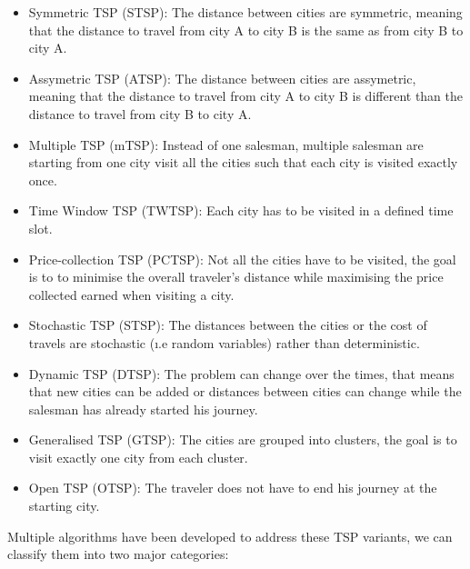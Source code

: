 \begin{itemize}
    \item Symmetric TSP (STSP): The distance between cities are symmetric, meaning that the distance to travel from city A to city B is the same as from city B to city A. %
    \item Assymetric TSP (ATSP): The distance between cities are assymetric, meaning that the distance to travel from city A to city B is different than the distance to travel from city B to city A.\cite{ASTP}
    \item Multiple TSP (mTSP): Instead of one salesman, multiple salesman are starting from one city visit all the cities such that each city is visited exactly once. \cite{mTSP}
    \item Time Window TSP (TWTSP): Each city has to be visited in a defined time slot. \cite{TWTSP}
    \item Price-collection TSP (PCTSP): Not all the cities have to be visited, the goal is to to minimise the overall traveler's distance while maximising the price collected earned when visiting a city. \cite{PCTSP}
    \item Stochastic TSP (STSP): The distances between the cities or the cost of travels are stochastic (\i.e random variables) rather than deterministic. \cite{Stochastic_TSP}
    \item Dynamic TSP (DTSP): The problem can change over the times, that means that new cities can be added or distances between cities can change while the salesman has already started his journey. \cite{DTSP}
    \item Generalised TSP (GTSP): The cities are grouped into clusters, the goal is to visit exactly one city from each cluster. \cite{GTSP}
    \item Open TSP (OTSP): The traveler does not have to end his journey at the starting city. \cite{OTSP}
\end{itemize}

Multiple algorithms have been developed to address these TSP variants, we can classify them into two major categories:

